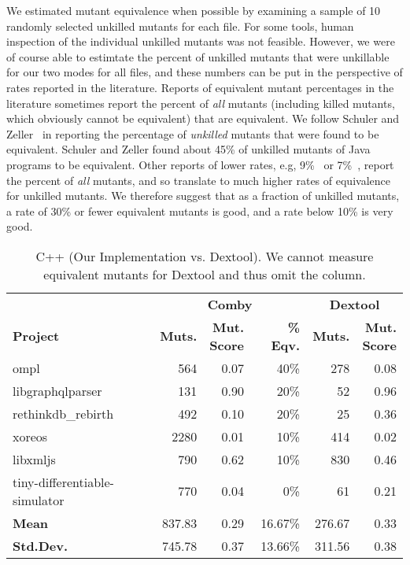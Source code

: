 \documentclass[sigconf,review, anonymous]{acmart}
\begin{document}
We estimated mutant equivalence when possible by examining a sample of
10 randomly selected unkilled mutants for each file.  For some tools,
human inspection of the individual unkilled mutants was not feasible.
However, we were of course able to estimtate the percent of unkilled
mutants that were unkillable for our two modes for all files, and
these numbers can be put in the perspective of rates reported in the
literature.  Reports of equivalent mutant percentages in the
literature sometimes report the percent of \emph{all} mutants
(including killed mutants, which obviously cannot be equivalent) that
are equivalent.  We follow Schuler and Zeller~\cite{EquivMut} in
reporting the percentage of \emph{unkilled} mutants that were found to
be equivalent.  Schuler and Zeller found about 45\% of unkilled
mutants of Java programs to be equivalent.  Other reports of lower
rates, e.g, 9\%~\cite{offutt1997automatically} or 7\%~\cite{TCE}, report the percent of
\emph{all} mutants, and so translate to much higher rates of
equivalence for unkilled mutants.  We therefore suggest that as a
fraction of unkilled mutants, a rate of 30\% or fewer equivalent
mutants is good, and a rate below 10\% is very good.

\begin{table}[htbp]
\centering
{\small
\caption{C++ (Our Implementation vs. Dextool). We cannot measure equivalent mutants for Dextool and thus omit the column.}
\label{tab:table_cpp2}
\begin{tabularx}{\columnwidth}{X|rrr|rr}
\toprule
        & \multicolumn{3}{c|}{\textbf{Comby}}  & \multicolumn{2}{c}{\textbf{Dextool}} \\ 
\textbf{Project} & \textbf{Muts.} & \makecell{\textbf{Mut.} \\ \textbf{Score}} & \textbf{\% Eqv.} & \textbf{Muts.} & \makecell{\textbf{Mut.} \\ \textbf{Score}} \\[1ex]\midrule
 ompl &  564 & 0.07 & 40\% & 278 & 0.08  \\
 libgraphqlparser  &  131 & 0.90 & 20\% & 52 & 0.96  \\
 rethinkdb\_rebirth &  492 & 0.10 & 20\% & 25 & 0.36 \\
 xoreos &  2280 & 0.01 & 10\% & 414 & 0.02  \\
 libxmljs &  790 & 0.62 & 10\% & 830 & 0.46 \\[0.5ex]
 tiny-differentiable-simulator &  770 & 0.04 & 0\% & 61 & 0.21  \\\midrule
\textbf{Mean}   & 837.83 & 0.29 & 16.67\% & 276.67 & 0.33\\
\textbf{Std.Dev.} & 745.78 & 0.37 & 13.66\%   & 311.56 & 0.38 \\\bottomrule
\end{tabularx}}
\end{table}
\end{document}
